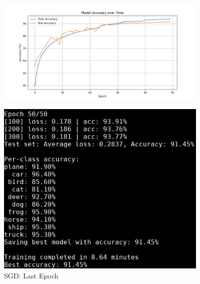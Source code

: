 \documentclass{beamer}
\begin{document}
\begin{frame}
\begin{columns}
    \begin{column}{0.5\textwidth}
        \begin{figure}[t]
            \centering
            \vspace{-0.4cm}
            \includegraphics[width=0.9\textwidth]{media/cifar10_cnn_sgd_accuracy.png}
        \end{figure}
        \vspace{-0.8cm}
        \begin{figure}[t]
            \centering
            \includegraphics[width=0.9\textwidth]{media/cnn_sgd_epoch_50.png}
            \vspace{-0.3cm}
            \caption{SGD: Last Epoch}
        \end{figure}
    \end{column}
\end{columns}
\end{frame}
\end{document}
